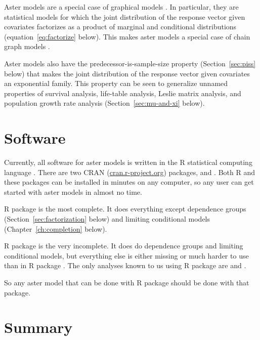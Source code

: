 Aster models are a special case of graphical models \citep{lauritzen}.
In particular, they are statistical models for which the joint distribution
of the response vector given covariates factorizes as a product of marginal and
conditional distributions (equation~\eqref{eq:factorize} below).
This makes aster models a special case of chain graph models
\citep[Sections~2.1.1 and~3.2.3]{lauritzen}.

Aster models also have the predecessor-is-sample-size property
(Section~\ref{sec:piss} below)
that makes the joint distribution of the response vector given covariates
an exponential
family.  This property can be seen to generalize unnamed properties
of survival analysis, life-table analysis, Leslie matrix analysis,
and population growth rate analysis (Section~\ref{sec:mu-and-xi} below).

\section{Software}
\label{sec:software}

Currently, all software for aster models is written in the R statistical
computing language \citep{r-core}.  There are two CRAN
(\url{cran.r-project.org}) packages,  \citep{aster-package} and
 \citep{aster2-package}.
Both R and these packages can be installed in minutes on any computer,
so any user can get started with aster models in almost no time.

R package  is the most complete.
It does everything except dependence groups
(Section~\ref{sec:factorization} below)
and limiting conditional models
(Chapter~\ref{ch:completion} below).

R package  is the very incomplete.
It does do dependence groups and limiting conditional models, but everything
else is either missing or much harder to use than in R package .
The only analyses known to us using R package  are
\citet{aster-hornworm} and \citet*{aster-microbial-symbionts}.

So any aster model that can be done with R package  should
be done with that package.

\pagebreak[3]

\section{Summary}

